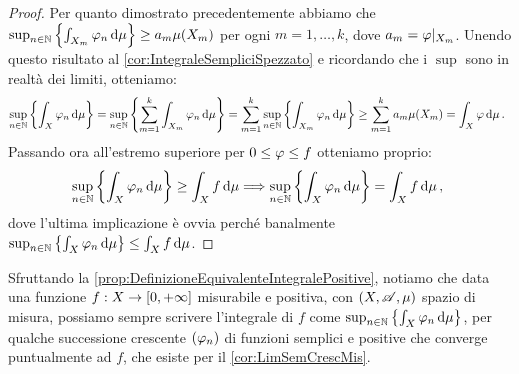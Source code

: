 \begin{proof}
	Per quanto dimostrato precedentemente abbiamo che $\sup_{n\in\mathbb N}\left\{\int_{X_m}\varphi_n\,\mathrm d\mu\right\}\ge a_m\mu(X_m)$ per ogni $m=1,\dots,k$, dove $a_m=\varphi|_{X_m}$. Unendo questo risultato al \cref{cor:IntegraleSempliciSpezzato} e ricordando che i $\sup$ sono in realtà dei limiti, otteniamo:
	\begin{equation*}
		\sup_{n\in\mathbb N}\left\{\int_X\varphi_n\,\mathrm d\mu\right\}=\sup_{n\in\mathbb N}\left\{\sum_{m=1}^k \int_{X_m}\varphi_n\,\mathrm d \mu\right\}=\sum_{m=1}^k\sup_{n\in\mathbb N}\left\{ \int_{X_m}\varphi_n\,\mathrm d \mu\right\}\ge \sum_{m=1}^ka_m\mu(X_m)=\int_X\varphi\,\mathrm d\mu\, \text{. }
	\end{equation*}
	Passando ora all'estremo superiore per $0\le \varphi \le f$ otteniamo proprio:
	\begin{equation*}
		\sup_{n\in\mathbb N}\left\{\int_X\varphi_n\,\mathrm d\mu\right\}\ge \int_X f \,\mathrm d\mu\Longrightarrow \sup_{n\in\mathbb N}\left\{\int_X\varphi_n\,\mathrm d\mu\right\}= \int_X f\,\mathrm d\mu\, \text{, }
	\end{equation*}
	dove l'ultima implicazione è ovvia perché banalmente $\sup_{n\in\mathbb N}\left\{\int_X\varphi_n\,\mathrm d\mu\right\}\le \int_X f\,\mathrm d\mu$.
\end{proof}

\begin{remark}\label{nota:ApprossimazioneIntegralePositiveConSemplici}
	Sfruttando la \cref{prop:DefinizioneEquivalenteIntegralePositive}, notiamo che data una funzione $f:X\to[0,+\infty]$ misurabile e positiva, con $(X,\mathscr A,\mu)$ spazio di misura, possiamo sempre scrivere l'integrale di $f$ come $\sup_{n\in\mathbb N}\left\{\int_X\varphi_n\,\mathrm d\mu\right\}$, per qualche successione crescente $(\varphi_n)$ di funzioni semplici e positive che converge puntualmente ad $f$, che esiste per il \cref{cor:LimSemCrescMis}.
\end{remark}


